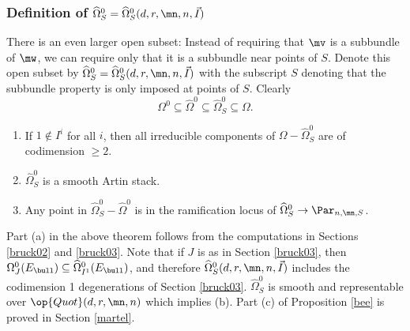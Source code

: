 \subsubsection{Definition of $\widehat{\Omega}_{S}^0=\widehat{\Omega}_{S}^0(d,r,\mn,n,\vec{I})$}

There is an even larger  open subset: Instead of requiring that $\mv$ is a subbundle of $\mw$, we can require only that it is a subbundle near points of $S$. Denote this open subset by $\widehat{\Omega}_{S}^0=\widehat{\Omega}_{S}^0(d,r,\mn,n,\vec{I})$ with the subscript $S$ denoting that the subbundle property is only imposed at points of $S$. Clearly $$\Omega^0\subseteq \widehat{\Omega}^0\subseteq \widehat{\Omega}_{S}^0\subseteq \Omega.$$
\begin{proposition}
\notready\label{bee}

\begin{enumerate}
\item[(a)] If $1\not\in I^i$ for all $i$, then   all irreducible components of $\Omega-\widehat{\Omega}_{S}^0$ are of codimension $\geq 2$.
\item[(b)] $\widehat{\Omega}_{S}^0$ is a smooth Artin stack.
\item[(c)] Any point in $\widehat{\Omega}_{S}^0-\widehat{\Omega}^0$ is in the ramification locus of $\widehat{\Omega}_{S}^0\to \Par_{n,\mn,S}$.
\end{enumerate}
\end{proposition}
Part (a) in the above theorem follows from the computations in Sections \ref{bruck02} and \ref{bruck03}.
Note that if $J$ is as in Section \ref{bruck03}, then ${\Omega}^0_J(E_{\bull}) \subseteq \widehat{\Omega}^0_{I^1}(E_{\bull})$, and therefore $\widehat{\Omega}_{S}^0(d,r,\mn,n,\vec{I})$ includes the codimension 1 degenerations of Section \ref{bruck03}.
 $\widehat{\Omega}_{S}^0$ is smooth and representable over $\op{Quot}(d,r,\mn,n)$ which implies (b).
 Part (c) of Proposition \ref{bee} is proved in  Section \ref{martel}.
